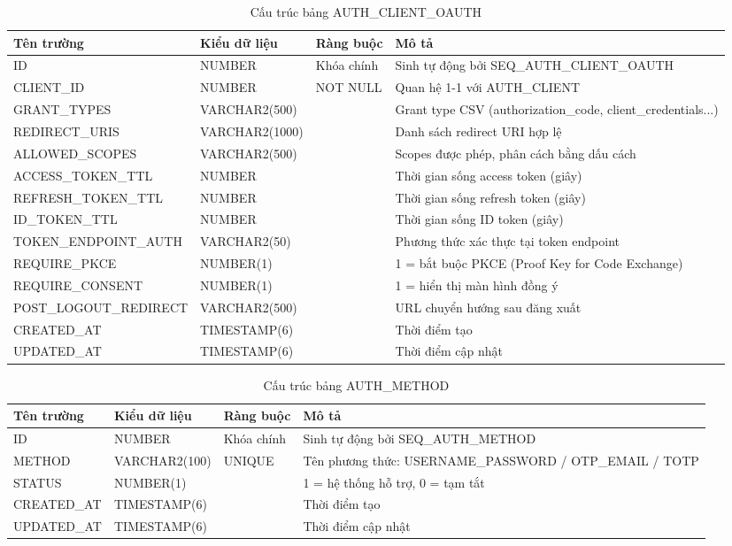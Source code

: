 \documentclass[../DoAn.tex]{subfiles}
\begin{document}
\begin{table}[H]
\centering
\caption{Cấu trúc bảng AUTH\_CLIENT\_OAUTH}
\label{tab:auth-client-oauth}
\footnotesize
\begin{tabular}{|p{3.0cm}|p{2.3cm}|p{2.7cm}|p{4.5cm}|}
\hline
\textbf{Tên trường} & \textbf{Kiểu dữ liệu} & \textbf{Ràng buộc} & \textbf{Mô tả} \\ \hline
ID & NUMBER & Khóa chính & Sinh tự động bởi SEQ\_AUTH\_CLIENT\_OAUTH \\ \hline
CLIENT\_ID & NUMBER & NOT NULL & Quan hệ 1-1 với AUTH\_CLIENT \\ \hline
GRANT\_TYPES & VARCHAR2(500) & & Grant type CSV (authorization\_code, client\_credentials...) \\ \hline
REDIRECT\_URIS & VARCHAR2(1000) & & Danh sách redirect URI hợp lệ \\ \hline
ALLOWED\_SCOPES & VARCHAR2(500) & & Scopes được phép, phân cách bằng dấu cách \\ \hline
ACCESS\_TOKEN\_TTL & NUMBER & & Thời gian sống access token (giây) \\ \hline
REFRESH\_TOKEN\_TTL & NUMBER & & Thời gian sống refresh token (giây) \\ \hline
ID\_TOKEN\_TTL & NUMBER & & Thời gian sống ID token (giây) \\ \hline
TOKEN\_ENDPOINT\_AUTH & VARCHAR2(50) & & Phương thức xác thực tại token endpoint \\ \hline
REQUIRE\_PKCE & NUMBER(1) & & 1 = bắt buộc PKCE (Proof Key for Code Exchange) \\ \hline
REQUIRE\_CONSENT & NUMBER(1) & & 1 = hiển thị màn hình đồng ý \\ \hline
POST\_LOGOUT\_REDIRECT & VARCHAR2(500) & & URL chuyển hướng sau đăng xuất \\ \hline
CREATED\_AT & TIMESTAMP(6) & & Thời điểm tạo \\ \hline
UPDATED\_AT & TIMESTAMP(6) & & Thời điểm cập nhật \\ \hline
\end{tabular}
\end{table}

\begin{table}[H]
\centering
\caption{Cấu trúc bảng AUTH\_METHOD}
\label{tab:auth-method}
\footnotesize
\begin{tabular}{|p{3.0cm}|p{2.3cm}|p{2.7cm}|p{4.5cm}|}
\hline
\textbf{Tên trường} & \textbf{Kiểu dữ liệu} & \textbf{Ràng buộc} & \textbf{Mô tả} \\ \hline
ID & NUMBER & Khóa chính & Sinh tự động bởi SEQ\_AUTH\_METHOD \\ \hline
METHOD & VARCHAR2(100) & UNIQUE & Tên phương thức: USERNAME\_PASSWORD / OTP\_EMAIL / TOTP \\ \hline
STATUS & NUMBER(1) & & 1 = hệ thống hỗ trợ, 0 = tạm tắt \\ \hline
CREATED\_AT & TIMESTAMP(6) & & Thời điểm tạo \\ \hline
UPDATED\_AT & TIMESTAMP(6) & & Thời điểm cập nhật \\ \hline
\end{tabular}
\end{table}
\end{document}
